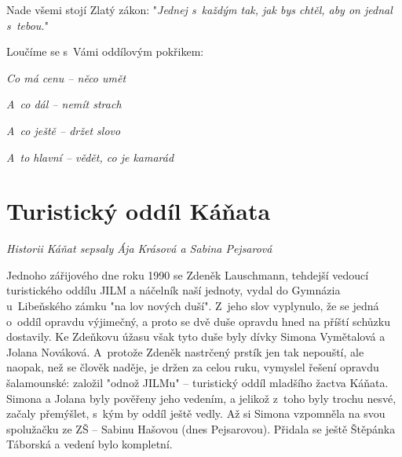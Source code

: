 \documentclass[a5paper, 11pt, twoside]{article}
\begin{document}
Nade všemi stojí Zlatý zákon: "\textit{Jednej s~každým tak, jak bys
chtěl, aby on jednal s~tebou.}"

Loučíme se s~Vámi oddílovým pokřikem:

\textit{Co má cenu -- něco umět}

\textit{A~co dál -- nemít strach}

\textit{A~co ještě -- držet slovo}

\textit{A~to hlavní -- vědět, co je kamarád}

\section{Turistický oddíl
Káňata}

\textit{Historii Káňat sepsaly Ája Krásová a Sabina Pejsarová}

Jednoho zářijového dne roku 1990 se Zdeněk Lauschmann, tehdejší vedoucí
turistického oddílu JILM a náčelník naší jednoty, vydal do Gymnázia
u~Libeňského zámku "na lov nových duší". Z~jeho slov vyplynulo, že se
jedná o~oddíl opravdu výjimečný, a proto se dvě duše opravdu hned na
příští schůzku dostavily. Ke Zdeňkovu úžasu však tyto duše byly dívky
Simona Vymětalová a Jolana Nováková. A~protože Zdeněk nastrčený prstík
jen tak nepouští, ale naopak, než se člověk naděje, je držen za celou
ruku, vymyslel řešení opravdu šalamounské: založil "odnož JILMu" --
turistický oddíl mladšího žactva Káňata. Simona a Jolana byly pověřeny
jeho vedením, a jelikož z~toho byly trochu nesvé, začaly přemýšlet,
s~kým by oddíl ještě vedly. Až si Simona vzpomněla na svou spolužačku ze
ZŠ -- Sabinu Hašovou (dnes Pejsarovou). Přidala se ještě Štěpánka
Táborská a vedení bylo kompletní.
\end{document}
